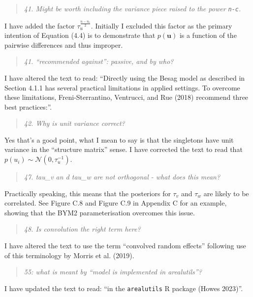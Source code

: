 \documentclass[
  12pt,
]{article}
\begin{document}
\begin{quote}
\emph{41. Might be worth including the variance piece raised to the
power \texttt{n-c}.}
\end{quote}

I have added the factor \(\tau_u^{\frac{n - n_c}{2}}\). Initially I
excluded this factor as the primary intention of Equation (4.4) is to
demonstrate that \(p(\mathbf{u})\) is a function of the pairwise
differences and thus improper.

\begin{quote}
\emph{41. ``recommended against'': passive, and by who?}
\end{quote}

I have altered the text to read: ``Directly using the Besag model as
described in Section 4.1.1 has several practical limitations in applied
settings. To overcome these limitations, Freni-Sterrantino, Ventrucci,
and Rue (2018) recommend three best practices:''.

\begin{quote}
\emph{42. Why is unit variance correct?}
\end{quote}

Yes that's a good point, what I mean to say is that the singletons have
unit variance in the ``structure matrix'' sense. I have corrected the
text to read that \(p(u_i) \sim \mathcal{N}(0, \tau_u^{-1})\).

\begin{quote}
\emph{47. tau\_v an d tau\_w are not orthogonal - what does this mean?}
\end{quote}

Practically speaking, this means that the posteriors for \(\tau_v\) and
\(\tau_w\) are likely to be correlated. See Figure C.8 and Figure C.9 in
Appendix C for an example, showing that the BYM2 parameterisation
overcomes this issue.

\begin{quote}
\emph{48. Is convolution the right term here?}
\end{quote}

I have altered the text to use the term ``convolved random effects''
following use of this terminology by Morris et al. (2019).

\begin{quote}
\emph{55: what is meant by ``model is implemented in arealutils''?}
\end{quote}

I have updated the text to read: ``in the \texttt{arealutils} R package
(Howes 2023)''.
\end{document}
